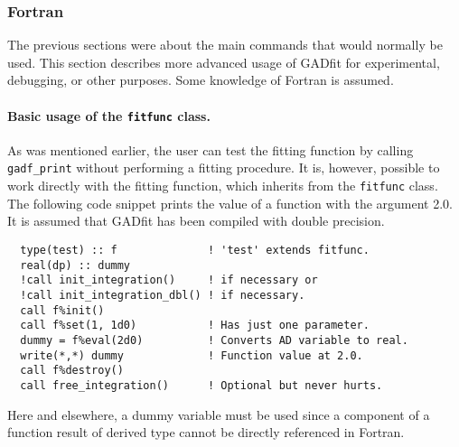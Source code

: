 \documentclass{article}
\begin{document}
\subsubsection{Fortran}

The previous sections were about the main commands that would normally be used. This section describes more advanced usage of GADfit for experimental, debugging, or other purposes. Some knowledge of Fortran is assumed.

\paragraph{Basic usage of the \texttt{fitfunc} class.} As was mentioned earlier, the user can test the fitting function by calling \verb+gadf_print+ without performing a fitting procedure. It is, however, possible to work directly with the fitting function, which inherits from the \verb+fitfunc+ class. The following code snippet prints the value of a function with the argument 2.0. It is assumed that GADfit has been compiled with double precision.
\begin{verbatim}
  type(test) :: f              ! 'test' extends fitfunc.
  real(dp) :: dummy
  !call init_integration()     ! if necessary or
  !call init_integration_dbl() ! if necessary.
  call f%init()
  call f%set(1, 1d0)           ! Has just one parameter.
  dummy = f%eval(2d0)          ! Converts AD variable to real.
  write(*,*) dummy             ! Function value at 2.0.
  call f%destroy()
  call free_integration()      ! Optional but never hurts.
\end{verbatim}
Here and elsewhere, a dummy variable must be used since a component of a function result of derived type cannot be directly referenced in Fortran.
\end{document}
